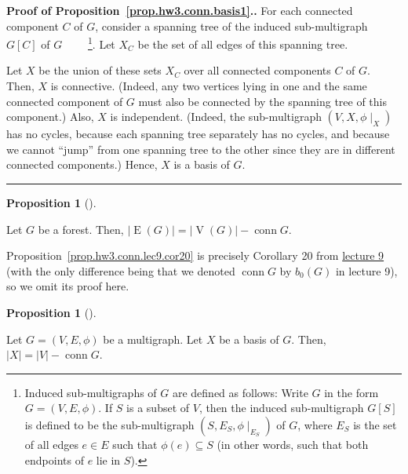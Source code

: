 \documentclass[numbers=enddot,12pt,final,onecolumn,notitlepage]{scrartcl}%
\theoremstyle{definition}
\newtheorem{prop}[theo]{Proposition}
\newenvironment{proposition}[1][]
{\begin{prop}[#1]\begin{leftbar}}
{\end{leftbar}\end{prop}}
\newenvironment{proof}[1][Proof]{\noindent\textbf{#1.} }{\ \rule{0.5em}{0.5em}}
\newcommand{\conn}{\operatorname{conn}}
\newcommand{\abs}[1]{\left| #1 \right|}
\newcommand{\tup}[1]{\left( #1 \right)}
\newcommand{\ive}[1]{\left[ #1 \right]}
\newcommand{\verts}[1]{\operatorname{V}\left( #1 \right)}
\newcommand{\edges}[1]{\operatorname{E}\left( #1 \right)}
\begin{document}
\begin{proof}[Proof of Proposition~\ref{prop.hw3.conn.basis1}.]
For each connected component $C$ of $G$, consider a spanning
tree of the induced sub-multigraph $G\ive{C}$ of $G$
\ \ \ \ \footnote{Induced sub-multigraphs of $G$ are defined as
follows:
Write $G$ in the form $G = \tup{V, E, \phi}$.
If $S$ is a subset of $V$, then the induced sub-multigraph
$G\ive{S}$ is defined to be the sub-multigraph
$\tup{S, E_S, \phi\mid_{E_S}}$ of $G$, where $E_S$ is the set
of all edges $e \in E$ such that $\phi\tup{e} \subseteq S$
(in other words, such that both endpoints of $e$ lie in $S$).}.
Let $X_C$ be the set of all edges of this spanning tree.

Let $X$ be the union of these sets $X_C$ over all connected
components $C$ of $G$.
Then, $X$ is connective.
(Indeed, any two
vertices lying in one and the same connected component of $G$
must also be connected by the spanning tree of this component.)
Also, $X$ is independent.
(Indeed, the sub-multigraph $\tup{V, X, \phi\mid_X}$ has
no cycles, because each spanning tree separately has no cycles, and
because we cannot ``jump'' from one spanning tree to the other
since they are in different connected components.)
Hence, $X$ is a basis of $G$.
\end{proof}

\begin{proposition} \label{prop.hw3.conn.lec9.cor20}
Let $G$ be a forest.
Then, $\abs{\edges{G}} = \abs{\verts{G}} - \conn G$.
\end{proposition}

Proposition~\ref{prop.hw3.conn.lec9.cor20} is precisely
Corollary 20 from
\href{http://www-users.math.umn.edu/~dgrinber/5707s17/5707lec9.pdf}{lecture 9}
(with the only difference being that we denoted $\conn G$
by $b_0 \tup{G}$ in lecture 9),
so we omit its proof here.

\begin{proposition} \label{prop.hw3.conn.basis2}
Let $G = \tup{V, E, \phi}$ be a multigraph.
Let $X$ be a basis of $G$.
Then, $\abs{X} = \abs{V} - \conn G$.
\end{proposition}
\end{document}
